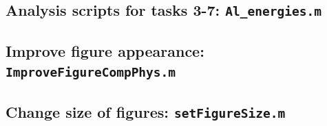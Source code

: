 \subsection{Analysis scripts for tasks 3-7: \texttt{Al\_energies.m}}


\subsection{Improve figure appearance: \texttt{ImproveFigureCompPhys.m}}


\subsection{Change size of figures: \texttt{setFigureSize.m}}




